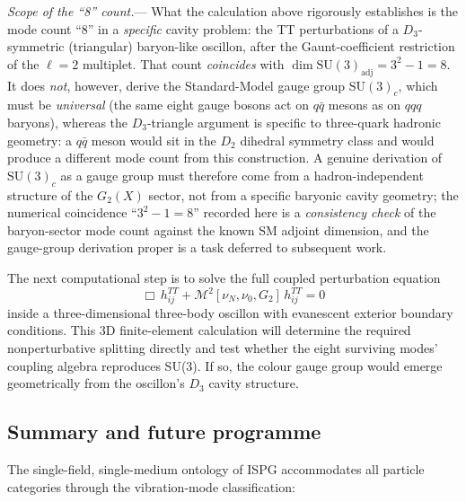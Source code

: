 \documentclass[11pt]{article}
\begin{document}
\textit{Scope of the ``8'' count.}---%
What the calculation above rigorously
establishes is the mode count ``$8$'' in a
\emph{specific} cavity problem: the TT
perturbations of a $D_3$-symmetric
(triangular) baryon-like oscillon, after
the Gaunt-coefficient restriction of the
$\ell=2$ multiplet.  That count \emph{coincides}
with $\dim\mathrm{SU}(3)_{\mathrm{adj}} =
3^2-1 = 8$.  It does \emph{not}, however,
derive the Standard-Model gauge group
$\mathrm{SU}(3)_c$, which must be
\emph{universal} (the same eight gauge bosons
act on $q\bar q$ mesons as on $qqq$ baryons),
whereas the $D_3$-triangle argument is
specific to three-quark hadronic geometry: a
$q\bar q$ meson would sit in the $D_2$ dihedral
symmetry class and would produce a different
mode count from this construction.  A genuine
derivation of $\mathrm{SU}(3)_c$ as a gauge
group must therefore come from a
hadron-independent structure of the $G_2(X)$
sector, not from a specific baryonic cavity
geometry; the numerical coincidence
``$3^2-1=8$'' recorded here is a
\emph{consistency check} of the
baryon-sector mode count against the known SM
adjoint dimension, and the gauge-group
derivation proper is a task deferred to
subsequent work.

The next computational step is to solve the full
coupled perturbation equation
\begin{equation}\label{eq:gluon_modes}
  \Box\,h_{ij}^{TT}
  + \mathcal{M}^2[\nu_N, \nu_0, G_2]\,
  h_{ij}^{TT} = 0
\end{equation}
inside a three-dimensional three-body oscillon
with evanescent exterior boundary conditions.
This 3D finite-element calculation will determine
the required nonperturbative splitting directly
and test whether the eight surviving modes'
coupling algebra reproduces SU(3).  If so, the
colour gauge group would emerge geometrically
from the oscillon's $D_3$ cavity structure.

\subsection{Summary and future programme}
\label{sec:massless_summary}

The single-field, single-medium ontology of ISPG
accommodates all particle categories through the
vibration-mode classification:
\end{document}
